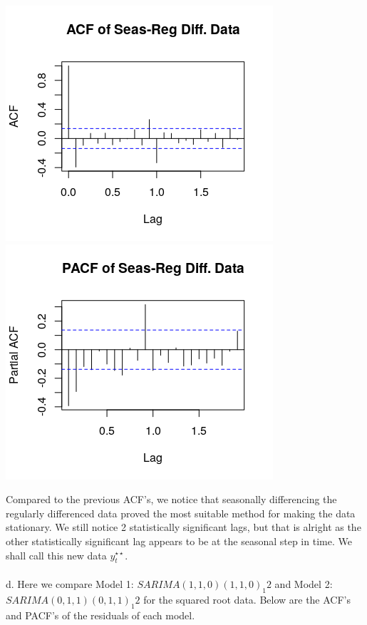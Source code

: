 \documentclass[11pt]{article}
\begin{document}
\begin{center}
\includegraphics[scale=.8]{1b3}
\includegraphics[scale=.8]{1b4}
\end{center}
Compared to the previous ACF's, we notice that seasonally differencing the regularly differenced data proved the most suitable method for making the data stationary. We still notice 2 statistically significant lags, but that is alright as the other statistically significant lag appears to be at the seasonal step in time. We shall call this new data $ y_t^{\star\star} $.
\\\\
d. Here we compare Model 1: $SARIMA(1,1,0)(1,1,0)_1 2$ and Model 2: $SARIMA(0,1,1)(0,1,1)_1 2$ for the squared root data. Below are the ACF's and PACF's of the residuals of each model.
\end{document}
